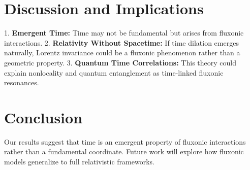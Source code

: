 \documentclass{article}
\begin{document}
\section{Discussion and Implications}
1. \textbf{Emergent Time:} Time may not be fundamental but arises from fluxonic interactions.
2. \textbf{Relativity Without Spacetime:} If time dilation emerges naturally, Lorentz invariance could be a fluxonic phenomenon rather than a geometric property.
3. \textbf{Quantum Time Correlations:} This theory could explain nonlocality and quantum entanglement as time-linked fluxonic resonances.

\section{Conclusion}
Our results suggest that time is an emergent property of fluxonic interactions rather than a fundamental coordinate. Future work will explore how fluxonic models generalize to full relativistic frameworks.
\end{document}

